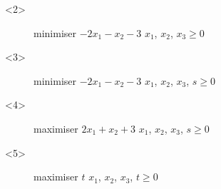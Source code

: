 \documentclass[aspectratio = 169]{beamer}
\begin{document}
\begin{frame}
\begin{columns}
\begin{column}{.55\textwidth}
\begin{overlayarea}{\textwidth}{.55\textheight}
        \begin{onlyenv}<2>
         ~
          \begin{figure}
            \begin{linearProg}{
                minimiser
              }{
                $-2x_1 - x_2 - 3$
              }{
              }{
                $x_1$, $x_2$, $x_3 \geq 0$
              }
            \end{linearProg}
          \end{figure}
        \end{onlyenv}
        \begin{onlyenv}<3>
          \begin{figure}
            \begin{linearProg}{
                minimiser
              }{
                $-2x_1 - x_2 - 3$
              }{
              }{
                $x_1$, $x_2$, $x_3$, $s \geq 0$
              }
            \end{linearProg}
          \end{figure}
        \end{onlyenv}
        \begin{onlyenv}<4>
          \begin{figure}
            \begin{linearProg}{
                maximiser
              }{
                $2x_1 + x_2 + 3$
              }{
              }{
                $x_1$, $x_2$, $x_3$, $s \geq 0$
              }
            \end{linearProg}
          \end{figure}
        \end{onlyenv}
        \begin{onlyenv}<5>
          \begin{figure}
            \begin{linearProg}{
                maximiser
              }{
                $t$
              }{
              }{
                $x_1$, $x_2$, $x_3$, $t \geq 0$
              }
            \end{linearProg}
          \end{figure}
        \end{onlyenv}
      \end{overlayarea}
    \end{column}
  \end{columns}
\end{frame}
\end{document}
